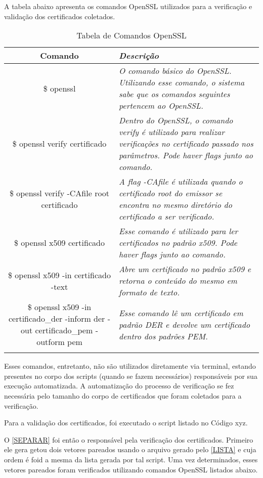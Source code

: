 		A tabela abaixo apresenta os comandos OpenSSL utilizados para a verificação e validação dos certificados coletados.

		\begin{center}
			\begin{longtable}{c>{\em}l}
			\toprule
			\textbf{Comando} & \textbf{Descrição} \\ \midrule
			\$ openssl & O comando básico do OpenSSL. Utilizando esse comando, o sistema sabe que os comandos seguintes pertencem ao OpenSSL. \\ 
			\rowcolor[gray]{0.9}
			\$ openssl verify certificado & Dentro do OpenSSL, o comando verify é utilizado para realizar verificações no certificado passado nos parâmetros. Pode haver flags junto ao comando. \\
			\$ openssl verify -CAfile root certificado & A flag -CAfile é utilizada quando o certificado root do emissor se encontra no mesmo diretório do certificado a ser verificado. \\
			\rowcolor[gray]{0.9}
			\$ openssl x509 certificado & Esse comando é utilizado para ler certificados no padrão x509. Pode haver flags junto ao comando. \\
			\$ openssl x509 -in certificado -text & Abre um certificado no padrão x509 e retorna o conteúdo do mesmo em formato de texto. \\
			\rowcolor[gray]{0.9}
			\$ openssl x509 -in certificado\_der -inform der -out certificado\_pem -outform pem & Esse comando lê um certificado em padrão DER e devolve um certificado dentro dos padrões PEM. \\
			\bottomrule
			\caption{Tabela de Comandos OpenSSL}
			\end{longtable}
		\end{center}
		Esses comandos, entretanto, não são utilizados diretamente via terminal, estando presentes no corpo dos scripts (quando se fazem necessários) responsáveis por sua execução automatizada. A automatização do processo de verificação se fez necessária pelo tamanho do corpo de certificados que foram coletados para a verificação.

	    Para a validação dos certificados, foi executado o script listado no Código xyz.

	    
	    O \ref{SEPARAR} foi então o responsável pela verificação dos certificados. Primeiro ele gera  getou dois vetores pareados usando o arquivo gerado pelo \ref{LISTA} e cuja ordem é  foid a mesma da lista gerada por tal script. Uma vez determinados, esses vetores pareados foram verificados utilizando comandos OpenSSL listados abaixo.

